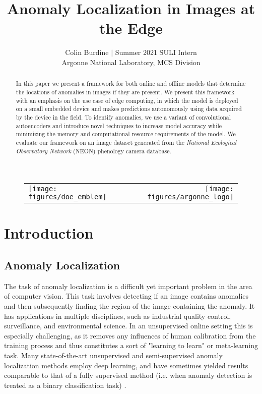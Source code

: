 \documentclass[12pt]{article}
\author{Colin Burdine $|$ Summer 2021 SULI Intern \\[6mm] Argonne National Laboratory, MCS Division}
\title{Anomaly Localization in Images at the Edge }
\begin{document}
\maketitle





\begin{abstract}
In this paper we present a framework for both online and offline models that determine the locations of anomalies in images if they are present.  We present this framework with an emphasis on the use case of edge computing, in which the model is deployed on a small embedded device and makes predictions autonomously using data acquired by the device in the field. To identify anomalies, we use a variant of convolutional autoencoders and introduce novel techniques to increase model accuracy while minimizing the memory and computational resource requirements of the model. We evaluate our framework on an image dataset generated from the \textit{National Ecological Observatory Network} (NEON) phenology camera database.
\end{abstract}

\begin{figure}
\begin{center}
\begin{tabular}{l r}
\texttt{[image: figures/doe\_emblem]} \qquad
& \qquad\texttt{[image: figures/argonne\_logo]} 
\end{tabular}
\end{center}
\end{figure}

\newpage

\tableofcontents
\newpage

\section{Introduction}

\subsection{Anomaly Localization}
The task of anomaly localization is a difficult yet important problem in the area of computer vision. This task involves detecting if an image contains anomalies and then subsequently finding the region of the image containing the anomaly. It has applications in multiple disciplines, such as industrial quality control, surveillance, and environmental science. In an unsupervised online setting this is especially challenging, as it removes any influences of human calibration from the training process and thus constitutes a sort of "learning to learn" or meta-learning task. Many state-of-the-art unsupervised and semi-supervised anomaly localization methods employ deep learning, and have sometimes yielded results comparable to that of a fully supervised method (i.e. when anomaly detection is treated as a binary classification task) \cite{attention_anomalies}.\\
\end{document}
